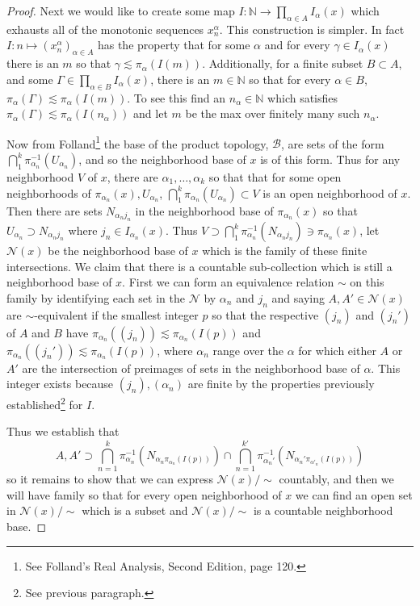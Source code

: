 \documentclass[11pt]{amsart}
\theoremstyle{definition}
\numberwithin{theorem}{section}
\numberwithin{definition}{section}
\numberwithin{equation}{section}
\def\scriptb{{\mathcal B}}
\def\scriptn{{\mathcal N}}
\begin{document}
\begin{proof}
	Next we would like to create some map $I:\mathbb{N} \to \prod_{\alpha\in A} I_\alpha(x)$ which exhausts all of the monotonic sequences $x^\alpha_n.$ This construction is simpler. In fact $I: n \mapsto (x^\alpha_n)_{\alpha \in A}$ has the property that for some $\alpha$ and for every $\gamma \in I_\alpha(x)$ there is an $m$ so that $\gamma \lesssim \pi_\alpha(I(m))$. Additionally, for a finite subset $B \subset A$, and some $\Gamma \in \prod_{\alpha \in B} I_\alpha(x)$, there is an $m \in \mathbb{N}$ so that for every $\alpha \in B$, $\pi_\alpha(\Gamma) \lesssim \pi_\alpha(I(m))$. To see this find an $n_\alpha \in \mathbb{N}$ which satisfies $\pi_\alpha(\Gamma) \lesssim \pi_\alpha(I(n_\alpha))$ and let $m$ be the max over finitely many such $n_\alpha$.

	Now from Folland\footnote{See Folland's Real Analysis, Second Edition, page 120.} the base of the product topology, $\scriptb$, are sets of the form $\bigcap_1^k \pi_{\alpha_n}^{-1}(U_{\alpha_n})$, and so the neighborhood base of $x$ is of this form. Thus for any neighborhood $V$ of $x$, there are $\alpha_1,\dots,\alpha_k$ so that that for some open neighborhoods of $\pi_{\alpha_n}(x), U_{\alpha_n}$, $\bigcap_1^k \pi_{\alpha_n}(U_{\alpha_n}) \subset V$ is an open neighborhood of $x$. Then there are sets $N_{\alpha_n j_n}$ in the neighborhood base of $\pi_{\alpha_n}(x)$ so that $U_{\alpha_n} \supset N_{\alpha_n j_n}$ where $j_n \in I_{\alpha_n}(x)$. Thus $V \supset \bigcap_1^k 	 \pi_{\alpha_n}^{-1}(N_{\alpha_n j_n}) \ni \pi_{\alpha_n}(x)$, let $\scriptn(x)$ be the neighborhood base of $x$ which is the family of these finite intersections. We claim that there is a countable sub-collection which is still a neighborhood base of $x$. First we can form an equivalence relation $\sim$ on this family by identifying each set in the $\scriptn$ by $\alpha_n$ and $j_n$ and 
	saying $A,A' \in \scriptn(x)$ are $\sim$-equivalent if the smallest integer $p$ so that the respective $(j_n)$ and $(j_n')$ of $A$ and $B$ have $\pi_{\alpha_n}((j_n)) \lesssim \pi_{\alpha_n}(I(p))$ and $\pi_{\alpha_n}((j_n')) \lesssim \pi_{\alpha_n}(I(p))$, where $\alpha_n$ range over the $\alpha$ for which either $A$ or $A'$ are the intersection of preimages of sets in the neighborhood base of $\alpha.$ This integer exists because $(j_n), (\alpha_n)$ are finite by the properties previously established\footnote{See previous paragraph.} for $I$.

	Thus we establish that $$A, A' \supset \bigcap_{n=1}^k \pi^{-1}_{\alpha_n}\left(N_{\alpha_n \pi_{\alpha_{n}}(I(p))}\right) \cap \bigcap_{n=1}^{k'} \pi^{-1}_{\alpha_n'}\left(N_{\alpha_n' \pi_{\alpha'_{n}}(I(p))}\right)$$
	so it remains to show that we can express $\scriptn(x)/\sim$ countably, and then we will have family so that for every open neighborhood of $x$ we can find an open set in $\scriptn(x)/\sim$ which is a subset and $\scriptn(x)/\sim$ is a countable neighborhood base.


\end{proof}
\end{document}
